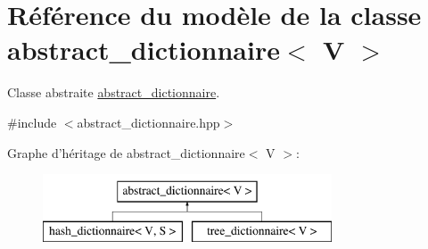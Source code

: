 \hypertarget{classabstract__dictionnaire}{\section{Référence du modèle de la classe abstract\-\_\-dictionnaire$<$ V $>$}
\label{classabstract__dictionnaire}
}


Classe abstraite \hyperlink{classabstract__dictionnaire}{abstract\-\_\-dictionnaire}.  




{\ttfamily \#include $<$abstract\-\_\-dictionnaire.\-hpp$>$}

Graphe d'héritage de abstract\-\_\-dictionnaire$<$ V $>$\-:\begin{figure}[H]
\begin{center}
\leavevmode
\includegraphics[height=2.000000cm]{classabstract__dictionnaire}
\end{center}
\end{figure}
